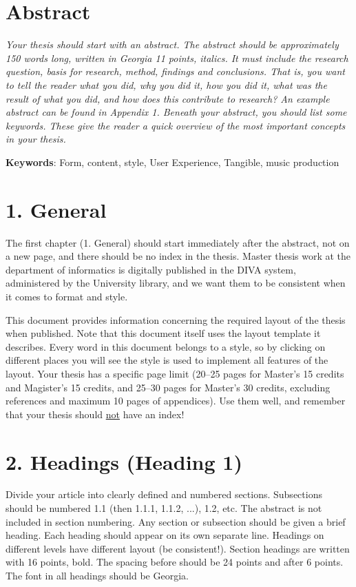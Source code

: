 \documentclass[]{article}
\author{}
\date{}
\begin{document}
\section{\centering Abstract}\label{abstract}

\emph{Your thesis should start with an abstract. The abstract should be
approximately 150 words long, written in Georgia 11 points, italics. It
must include the research question, basis for research, method, findings
and conclusions. That is, you want to tell the reader what you did, why
you did it, how you did it, what was the result of what you did, and how
does this contribute to research? An example abstract can be found in
Appendix 1. Beneath your abstract, you should list some keywords. These
give the reader a quick overview of the most important concepts in your
thesis.}

\textbf{Keywords}: Form, content, style, User Experience, Tangible,
music production

\section{1. General}\label{general}

The first chapter (1. General) should start immediately after the
abstract, not on a new page, and there should be no index in the thesis.
Master thesis work at the department of informatics is digitally
published in the DIVA system, administered by the University library, and
we want them to be consistent when it comes to format and style.

This document provides information concerning the required layout of the
thesis when published. Note that this document itself uses the layout
template it describes. Every word in this document belongs to a style, so
by clicking on different places you will see the style is used to
implement all features of the layout. Your thesis has a specific page
limit (20–25 pages for Master's 15 credits and Magister's 15 credits,
and 25–30 pages for Master's 30 credits, excluding references and
maximum 10 pages of appendices). Use them well, and remember that your
thesis should \ul{not} have an index!

\section{2. Headings (Heading 1)}\label{headings-heading-1}

Divide your article into clearly defined and numbered sections.
Subsections should be numbered 1.1 (then 1.1.1, 1.1.2, ...), 1.2, etc.
The abstract is not included in section numbering. Any section or
subsection should be given a brief heading. Each heading should appear
on its own separate line. Headings on different levels have different
layout (be consistent!). Section headings are written with 16 points,
bold. The spacing before should be 24 points and after 6 points. The
font in all headings should be Georgia.
\end{document}
